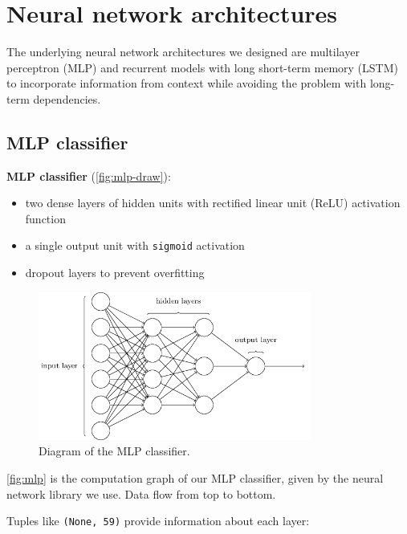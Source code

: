 \documentclass[11pt,a4paper]{report}
\begin{document}
\newpage

\section{Neural network architectures}

The underlying neural network architectures we designed are multilayer perceptron (MLP) and recurrent models with long short-term memory (LSTM) \parencite{hochreiter1997long} to incorporate information from context while avoiding the problem with long-term dependencies.

\subsection{MLP classifier}

\begin{mdframed}
\noindent \textbf{MLP classifier} (\autoref{fig:mlp-draw}):
\begin{itemize}
  \item two dense layers of hidden units with rectified linear unit (ReLU) activation function
  \item a single output unit with \texttt{sigmoid} activation
  \item dropout layers to prevent overfitting
\end{itemize}
\end{mdframed}

\begin{figure}[htbp]
  \centering
  \includegraphics[width=0.8\textwidth]{mlp.png}
  \caption{Diagram of the MLP classifier.} \label{fig:mlp-draw}
\end{figure}

\autoref{fig:mlp} is the computation graph of our MLP classifier, given by the neural network library we use.
Data flow from top to bottom.

Tuples like \texttt{(None, 59)} provide information about each layer:
\end{document}
